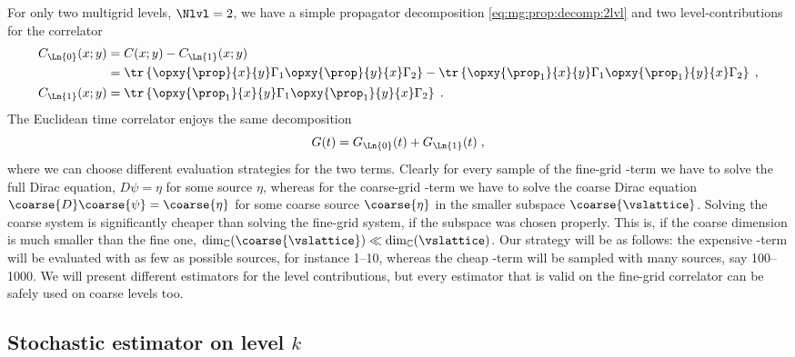 For only two multigrid levels, $\Nlvl=2$, we have a simple propagator decomposition \cref{eq:mg:prop:decomp:2lvl} and two level-contributions for the correlator
\begin{align}
&\begin{aligned}
C_{\Ln{0}}(x;y)
&= C(x;y) - C_{\Ln{1}}(x;y) \\
&= \tr \left\{ \opxy{\prop}{x}{y} \Gamma_1 \opxy{\prop}{y}{x} \Gamma_2 \right\}
 - \tr \left\{ \opxy{\prop_{1}}{x}{y} \Gamma_1 \opxy{\prop_{1}}{y}{x} \Gamma_2 \right\} \;,
\end{aligned} \\
&C_{\Ln{1}}(x;y)
= \tr \left\{ \opxy{\prop_{1}}{x}{y} \Gamma_1 \opxy{\prop_{1}}{y}{x} \Gamma_2 \right\} \;.
\end{align}
The Euclidean time correlator enjoys the same decomposition
\begin{equation}
G(t) = G_{\Ln{0}}(t) + G_{\Ln{1}}(t) \;,
\end{equation}
where we can choose different evaluation strategies for the two terms.
Clearly for every sample of the fine-grid -term we have to solve the full Dirac equation, $D \psi = \eta$ for some source $\eta$, whereas for the coarse-grid -term we have to solve the coarse Dirac equation $\coarse{D} \coarse{\psi} = \coarse{\eta}$ for some coarse source $\coarse{\eta}$ in the smaller subspace $\coarse{\vslattice}$.
Solving the coarse system is significantly cheaper than solving the fine-grid system, if the subspace was chosen properly.
This is, if the coarse dimension is much smaller than the fine one, $\dim_{\mathbb{C}}(\coarse{\vslattice}) \ll \dim_{\mathbb{C}}(\vslattice)$.
Our strategy will be as follows: the expensive -term will be evaluated with as few as possible sources, for instance \numrange{1}{10}, whereas the cheap -term will be sampled with many sources, say \numrange{100}{1000}.
We will present different estimators for the level contributions, but every estimator that is valid on the fine-grid correlator can be safely used on coarse levels too.



\subsection{Stochastic estimator on level $k$}

